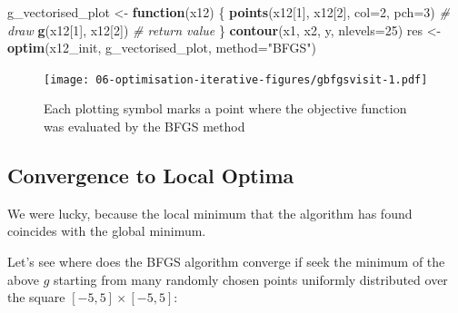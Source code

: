 \documentclass[10pt,b5paper,krantz1]{krantz}
\newenvironment{Shaded}{\begin{snugshade}}{\end{snugshade}}
\newcommand{\CommentTok}[1]{\textcolor[rgb]{0.37,0.37,0.37}{\textit{#1}}}
\newcommand{\ControlFlowTok}[1]{\textcolor[rgb]{0.27,0.27,0.27}{\textbf{#1}}}
\newcommand{\DataTypeTok}[1]{\textcolor[rgb]{0.27,0.27,0.27}{#1}}
\newcommand{\DecValTok}[1]{\textcolor[rgb]{0.06,0.06,0.06}{#1}}
\newcommand{\KeywordTok}[1]{\textcolor[rgb]{0.27,0.27,0.27}{\textbf{#1}}}
\newcommand{\NormalTok}[1]{#1}
\newcommand{\OperatorTok}[1]{\textcolor[rgb]{0.43,0.43,0.43}{\textbf{#1}}}
\newcommand{\StringTok}[1]{\textcolor[rgb]{0.5,0.5,0.5}{#1}}
\begin{document}
\begin{Shaded}
\begin{Highlighting}[]
\NormalTok{g_vectorised_plot <-}\StringTok{ }\ControlFlowTok{function}\NormalTok{(x12) \{}
    \KeywordTok{points}\NormalTok{(x12[}\DecValTok{1}\NormalTok{], x12[}\DecValTok{2}\NormalTok{], }\DataTypeTok{col=}\DecValTok{2}\NormalTok{, }\DataTypeTok{pch=}\DecValTok{3}\NormalTok{) }\CommentTok{# draw}
    \KeywordTok{g}\NormalTok{(x12[}\DecValTok{1}\NormalTok{], x12[}\DecValTok{2}\NormalTok{]) }\CommentTok{# return value}
\NormalTok{\}}
\KeywordTok{contour}\NormalTok{(x1, x2, y, }\DataTypeTok{nlevels=}\DecValTok{25}\NormalTok{)}
\NormalTok{res <-}\StringTok{ }\KeywordTok{optim}\NormalTok{(x12_init, g_vectorised_plot, }\DataTypeTok{method=}\StringTok{"BFGS"}\NormalTok{)}
\end{Highlighting}
\end{Shaded}

\begin{figure}
\hypertarget{fig:gbfgsvisit}{%
\centering
\texttt{[image: 06-optimisation-iterative-figures/gbfgsvisit-1.pdf]}
\caption{Each plotting symbol marks a point where the objective function was evaluated by the BFGS method}\label{fig:gbfgsvisit}
}
\end{figure}

\hypertarget{convergence-to-local-optima}{%
\subsection{Convergence to Local Optima}\label{convergence-to-local-optima}}

We were lucky, because the local minimum that the algorithm has found
coincides with the global minimum.

Let's see where does the BFGS algorithm converge if seek the minimum
of the above \(g\) starting
from many randomly chosen points
uniformly distributed over the square \([-5,5]\times[-5,5]\):

\begin{Shaded}
\end{Shaded}
\end{document}
